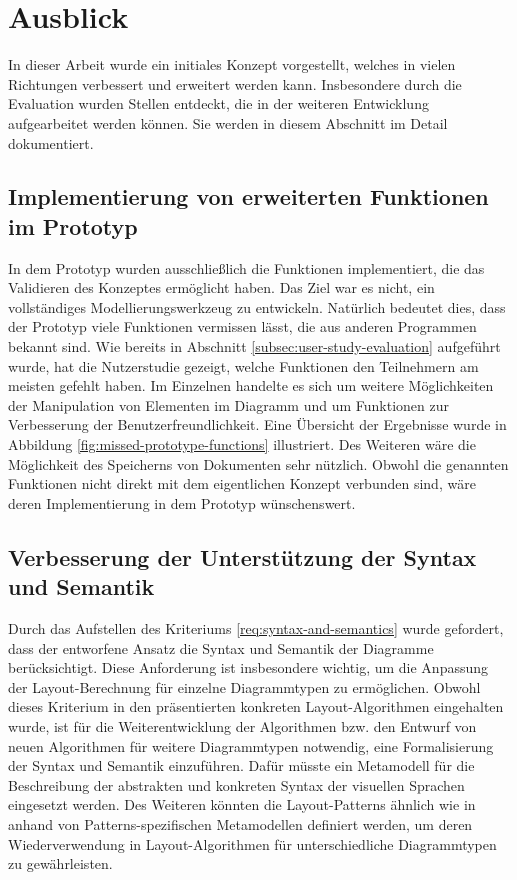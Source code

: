 \section{Ausblick}
\label{sec:outlook}

In dieser Arbeit wurde ein initiales Konzept vorgestellt, welches in vielen Richtungen verbessert und erweitert werden kann. Insbesondere durch die Evaluation wurden Stellen entdeckt, die in der weiteren Entwicklung aufgearbeitet werden können. Sie werden in diesem Abschnitt im Detail dokumentiert.

\subsection{Implementierung von erweiterten Funktionen im Prototyp}
\label{subsec:extension-of-the-prototype}

In dem Prototyp wurden ausschließlich die Funktionen implementiert, die das Validieren des Konzeptes ermöglicht haben. Das Ziel war es nicht, ein vollständiges Modellierungswerkzeug zu entwickeln. Natürlich bedeutet dies, dass der Prototyp viele Funktionen vermissen lässt, die aus anderen Programmen bekannt sind. Wie bereits in Abschnitt \ref{subsec:user-study-evaluation} aufgeführt wurde, hat die Nutzerstudie gezeigt, welche Funktionen den Teilnehmern am meisten gefehlt haben. Im Einzelnen handelte es sich um weitere Möglichkeiten der Manipulation von Elementen im Diagramm und um Funktionen zur Verbesserung der Benutzerfreundlichkeit. Eine Übersicht der Ergebnisse wurde in Abbildung \ref{fig:missed-prototype-functions} illustriert. Des Weiteren wäre die Möglichkeit des Speicherns von Dokumenten sehr nützlich. Obwohl die genannten Funktionen nicht direkt mit dem eigentlichen Konzept verbunden sind, wäre deren Implementierung in dem Prototyp wünschenswert.

\subsection{Verbesserung der Unterstützung der Syntax und Semantik}
\label{subsec:syntax-and-semantics-support-improvements}

Durch das Aufstellen des Kriteriums \ref{req:syntax-and-semantics} wurde gefordert, dass der entworfene Ansatz die Syntax und Semantik der Diagramme berücksichtigt. Diese Anforderung ist insbesondere wichtig, um die Anpassung der Layout-Berechnung für einzelne Diagrammtypen zu ermöglichen. Obwohl dieses Kriterium in den präsentierten konkreten Layout-Algorithmen eingehalten wurde, ist für die Weiterentwicklung der Algorithmen bzw. den Entwurf von neuen Algorithmen für weitere Diagrammtypen notwendig, eine Formalisierung der Syntax und Semantik einzuführen. Dafür müsste ein Metamodell für die Beschreibung der abstrakten und konkreten Syntax der visuellen Sprachen eingesetzt werden. Des Weiteren könnten die Layout-Patterns ähnlich wie in \cite{Maier12A-Pattern-based} anhand von Patterns-spezifischen Metamodellen definiert werden, um deren Wiederverwendung in Layout-Algorithmen für unterschiedliche Diagrammtypen zu gewährleisten.

